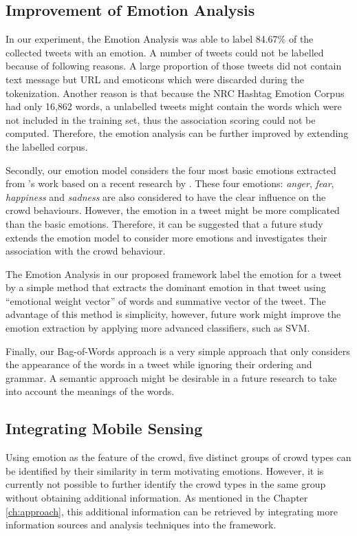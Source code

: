 \subsection{Improvement of Emotion Analysis}
In our experiment, the Emotion Analysis was able to label 84.67\% of the collected tweets with an emotion. A number of tweets could not be labelled because of following reasons. A large proportion of those tweets did not contain text message but URL and emoticons which were discarded during the tokenization. Another reason is that because the NRC Hashtag Emotion Corpus had only 16,862 words, a unlabelled tweets might contain the words which were not included in the training set, thus the association scoring could not be computed. Therefore, the emotion analysis can be further improved by extending the labelled corpus.

Secondly, our emotion model considers the four most basic emotions extracted from \citet{ekman1971constants}'s work based on a recent research by \citet{Jack2014}. These four emotions: \textit{anger}, \textit{fear}, \textit{happiness} and \textit{sadness} are also considered to have the clear influence on the crowd behaviours. However, the emotion in a tweet might be more complicated than the basic emotions. Therefore, it can be suggested that a future study extends the emotion model to consider more emotions and investigates their association with the crowd behaviour.

The Emotion Analysis in our proposed framework label the emotion for a tweet by a simple method that extracts the dominant emotion in that tweet using ``emotional weight vector'' of words and summative vector of the tweet. The advantage of this method is simplicity, however, future work might improve the emotion extraction by applying more advanced classifiers, such as SVM.

Finally, our Bag-of-Words approach is a very simple approach that only considers the appearance of the words in a tweet while ignoring their ordering and grammar. A semantic approach might be desirable in a future research to take into account the meanings of the words.

\subsection{Integrating Mobile Sensing}
Using emotion as the feature of the crowd, five distinct groups of crowd types can be identified by their similarity in term motivating emotions. However, it is currently not possible to further identify the crowd types in the same group without obtaining additional information. As mentioned in the Chapter \ref{ch:approach}, this additional information can be retrieved by integrating more information sources and analysis techniques into the framework. 

